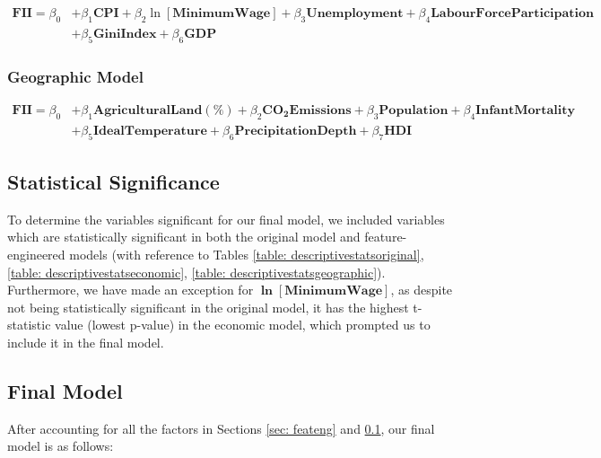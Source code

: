 \documentclass{article}
\begin{document}
\begin{equation}\label{economicmodel}
    \begin{aligned}
        \mathbf{FII} = \beta_0 &+ \beta_1\mathbf{CPI} + \beta_2\ln{[\mathbf{MinimumWage}]} + \beta_3\mathbf{Unemployment} + \beta_4\mathbf{LabourForceParticipation} \\ &+ \beta_5\mathbf{GiniIndex} + \beta_6\mathbf{GDP}
    \end{aligned}
\end{equation}

\subsubsection{Geographic Model}

\begin{equation}\label{geographicmodel}
    \begin{aligned}
        \mathbf{FII} = \beta_0 &+ \beta_1\mathbf{AgriculturalLand(\%)} + \beta_2\mathbf{CO_2Emissions} + \beta_3\mathbf{Population} + \beta_4\mathbf{InfantMortality} \\ &+ \beta_5\mathbf{IdealTemperature} + \beta_6\mathbf{PrecipitationDepth} + \beta_7\mathbf{HDI}
    \end{aligned}
\end{equation}

\subsection{Statistical Significance}\label{sec: statsig}
To determine the variables significant for our final model, we included variables which are statistically significant in both the original model and feature-engineered models (with reference to Tables \ref{table: descriptivestatsoriginal}, \ref{table: descriptivestatseconomic}, \ref{table: descriptivestatsgeographic}). Furthermore, we have made an exception for \textbf{$\bm{\ln{[\text{MinimumWage}]}}$}, as despite not being statistically significant in the original model, it has the highest t-statistic value (lowest p-value) in the economic model, which prompted us to include it in the final model. 

\subsection{Final Model}\label{sec:FinalModel}
After accounting for all the factors in Sections \ref{sec: feateng}
 and \ref{sec: statsig}, our final model is as follows:
 
\end{document}
